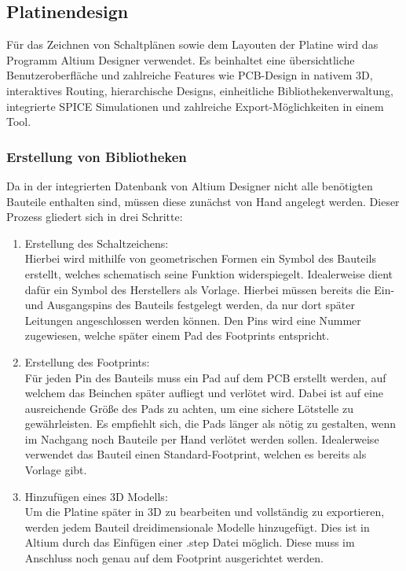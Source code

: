 

\subsection{Platinendesign}

Für das Zeichnen von Schaltplänen sowie dem Layouten der Platine wird das Programm Altium Designer verwendet. Es beinhaltet eine übersichtliche Benutzeroberfläche und zahlreiche Features wie PCB-Design in nativem 3D, interaktives Routing, hierarchische Designs, einheitliche Bibliothekenverwaltung, integrierte SPICE Simulationen und zahlreiche Export-Möglichkeiten in einem Tool. 


\subsubsection{Erstellung von Bibliotheken}
Da in der integrierten Datenbank von Altium Designer nicht alle benötigten Bauteile enthalten sind, müssen diese zunächst von Hand angelegt werden. Dieser Prozess gliedert sich in drei Schritte:

\begin{enumerate}
\item Erstellung des Schaltzeichens:\\
Hierbei wird mithilfe von geometrischen Formen ein Symbol des Bauteils erstellt, welches schematisch seine Funktion widerspiegelt. Idealerweise dient dafür ein Symbol des Herstellers als Vorlage. Hierbei müssen bereits die Ein- und Ausgangspins des Bauteils festgelegt werden, da nur dort später Leitungen angeschlossen werden können. Den Pins wird eine Nummer zugewiesen, welche später einem Pad des Footprints entspricht.

\item Erstellung des Footprints: \\
Für jeden Pin des Bauteils muss ein Pad auf dem PCB erstellt werden, auf welchem das Beinchen später aufliegt und verlötet wird. Dabei ist auf eine ausreichende Größe des Pads zu achten, um eine sichere Lötstelle zu gewährleisten. Es empfiehlt sich, die Pads länger als nötig zu gestalten, wenn im Nachgang noch Bauteile per Hand verlötet werden sollen. Idealerweise verwendet das Bauteil einen Standard-Footprint, welchen es bereits als Vorlage gibt. 

\item Hinzufügen eines 3D Modells: \\
Um die Platine später in 3D zu bearbeiten und vollständig zu exportieren, werden jedem Bauteil dreidimensionale Modelle hinzugefügt. Dies ist in Altium durch das Einfügen einer .step Datei möglich. Diese muss im Anschluss noch genau auf dem Footprint ausgerichtet werden.
\end{enumerate}

